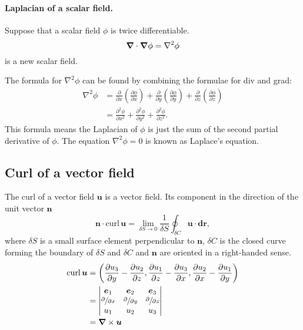 \paragraph{Laplacian of a scalar field. }
Suppose that a scalar field $\phi$ is twice differentiable. 
\begin{equation}
    \bm{\nabla} \cdot \bm{\nabla} \phi = \nabla^2 \phi
\end{equation}
is a new scalar field. 

The formula for $\nabla^2 \phi$ can be found by combining the formulae for div and grad: 
\begin{equation}
    \begin{aligned}
    \nabla^{2} \phi 
    &=\frac{\partial}{\partial x}\left(\frac{\partial \phi}{\partial x}\right)
    +\frac{\partial}{\partial y}\left(\frac{\partial \phi}{\partial y}\right)
    +\frac{\partial}{\partial z}\left(\frac{\partial \phi}{\partial z}\right) \\ 
    &=\frac{\partial^{2} \phi}{\partial x^{2}}+\frac{\partial^{2} \phi}{\partial y^{2}}+\frac{\partial^{2} \phi}{\partial z^{2}}. 
    \end{aligned}
\end{equation}
This formula means the Laplacian of $\phi$ is just the sum of the second partial derivative of $\phi$. 
The equation $\nabla^2 \phi = 0$ is known as Laplace's equation. 

\subsection{Curl of a vector field}
The curl of a vector field $\bm{u}$ is a vector field. Its component in the direction of the unit vector $\bm{n}$ 
\begin{equation}
    \bm{n} \cdot \mathrm{curl} \, \bm{u}
    =\lim _{\delta S \to 0} 
    \frac{1}{\delta S} 
    \oint_{\delta C} \bm{u} \cdot \bm{d} \bm{r}, 
\end{equation}
where $\delta S$ is a small surface element perpendicular to $\bm{n}$, $\delta C$ is the closed curve forming the boundary of $\delta S$ and $\delta C$ and $\bm{n}$ are oriented in a right-handed sense. 
\begin{equation}
\begin{aligned}
    \mathrm{curl} \, \bm{u}
    &=\left(\frac{\partial u_{3}}{\partial y}-\frac{\partial u_{2}}{\partial z}, 
    \frac{\partial u_{1}}{\partial z}-\frac{\partial u_{3}}{\partial x}, 
    \frac{\partial u_{2}}{\partial x}-\frac{\partial u_{1}}{\partial y}\right) \\
    &=  \begin{vmatrix}
        {\bm{e}_{1}} & {\bm{e}_{2}} & {\bm{e}_{3}} \\ 
        {\sfrac{\partial}{\partial x}} & {\sfrac{\partial}{\partial y}} & {\sfrac{\partial}{\partial z}} \\ 
        {u_{1}} & {u_{2}} & {u_{3}}
        \end{vmatrix} \\
    &= \bm{\nabla} \times \bm{u}
\end{aligned}
\end{equation}

